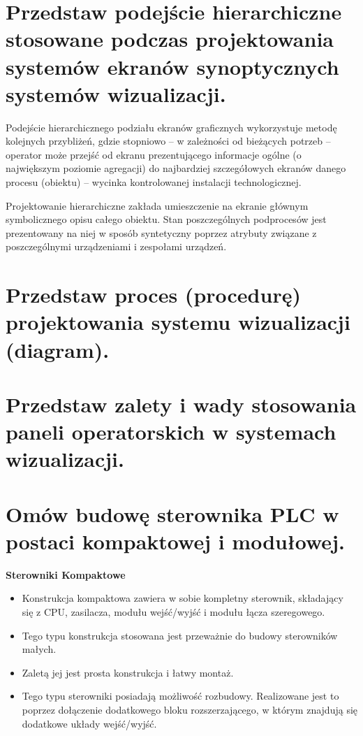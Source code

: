 \documentclass{article}
\begin{document}
	\section{Przedstaw podejście hierarchiczne stosowane podczas projektowania systemów	ekranów synoptycznych systemów wizualizacji.}
	Podejście hierarchicznego podziału ekranów graficznych wykorzystuje metodę kolejnych przybliżeń, gdzie stopniowo – w zależności od bieżących potrzeb – operator może przejść od ekranu prezentującego informacje ogólne (o największym poziomie agregacji) do najbardziej szczegółowych ekranów danego procesu (obiektu) – wycinka kontrolowanej instalacji technologicznej.
	
	Projektowanie hierarchiczne zakłada umieszczenie na ekranie głównym symbolicznego opisu całego obiektu. Stan poszczególnych podprocesów jest prezentowany na niej w sposób syntetyczny poprzez atrybuty związane z poszczególnymi urządzeniami i zespołami urządzeń.
	
	\section{Przedstaw proces (procedurę) projektowania systemu wizualizacji (diagram).}
	\section{ Przedstaw zalety i wady stosowania paneli operatorskich w systemach wizualizacji.}
	\section{ Omów budowę sterownika PLC w postaci kompaktowej i modułowej.}
	\textbf{Sterowniki  Kompaktowe}
	
	\begin{itemize}
	
	\item Konstrukcja kompaktowa  zawiera w sobie kompletny sterownik, składający się z CPU, zasilacza, modułu wejść/wyjść i modułu łącza szeregowego.
	
	\item Tego typu konstrukcja stosowana jest przeważnie do budowy sterowników małych.
	
	\item Zaletą jej jest prosta konstrukcja i łatwy montaż.
	
	\item Tego typu sterowniki posiadają możliwość rozbudowy. Realizowane jest to poprzez dołączenie dodatkowego bloku rozszerzającego, w którym znajdują się dodatkowe układy wejść/wyjść.
	
	\end{itemize}
	
\end{document}
